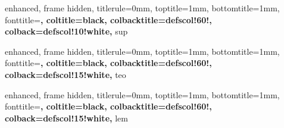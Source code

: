 
{
	enhanced,
	frame hidden,
	titlerule=0mm,
	toptitle=1mm,
	bottomtitle=1mm,
	fonttitle=\bfseries\large,
	coltitle=black,
	colbacktitle=defscol!60!,
	colback=defscol!10!white,
}{sup}



{
	enhanced,
	frame hidden,
	titlerule=0mm,
	toptitle=1mm,
	bottomtitle=1mm,
	fonttitle=\bfseries\large,
	coltitle=black,
	colbacktitle=defscol!60!,
	colback=defscol!15!white,
}{teo}



\newenvironment{teop}{
	{\noindent{\it \textbf{Demostración.}}}
	\tcolorbox[blanker,breakable,left=5mm,parbox=false,
	before upper={\parindent15pt},
	after skip=10pt,
	borderline west={1mm}{0pt}{thmscol!40!white}]
}{
	\textcolor{thmscol!40!white}{\hbox{}\nobreak\hfill$\blacksquare$} 
	\endtcolorbox
}


{
	enhanced,
	frame hidden,
	titlerule=0mm,
	toptitle=1mm,
	bottomtitle=1mm,
	fonttitle=\bfseries\large,
	coltitle=black,
	colbacktitle=defscol!60!,
	colback=defscol!15!white,
}{lem}

